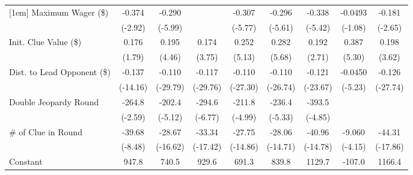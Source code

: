 \begin{table}[htbp]
\begin{tabular}{l*{8}{c}}
[1em]
Maximum Wager (\$)&      -0.374\sym{**} &      -0.290\sym{***}&                     &      -0.307\sym{***}&      -0.296\sym{***}&      -0.338\sym{***}&     -0.0493         &      -0.181\sym{**} \\
            &     (-2.92)         &     (-5.99)         &                     &     (-5.77)         &     (-5.61)         &     (-5.42)         &     (-1.08)         &     (-2.65)         \\
[1em]
Init. Clue Value (\$)&       0.176         &       0.195\sym{***}&       0.174\sym{***}&       0.252\sym{***}&       0.282\sym{***}&       0.192\sym{**} &       0.387\sym{***}&       0.198\sym{***}\\
            &      (1.79)         &      (4.46)         &      (3.75)         &      (5.13)         &      (5.68)         &      (2.71)         &      (5.30)         &      (3.62)         \\
[1em]
Dist. to Lead Opponent (\$)&      -0.137\sym{***}&      -0.110\sym{***}&      -0.117\sym{***}&      -0.110\sym{***}&      -0.110\sym{***}&      -0.121\sym{***}&     -0.0450\sym{***}&      -0.126\sym{***}\\
            &    (-14.16)         &    (-29.79)         &    (-29.76)         &    (-27.30)         &    (-26.74)         &    (-23.67)         &     (-5.23)         &    (-27.74)         \\
[1em]
Double Jeopardy Round&      -264.8\sym{**} &      -202.4\sym{***}&      -294.6\sym{***}&      -211.8\sym{***}&      -236.4\sym{***}&      -393.5\sym{***}&                     &                     \\
            &     (-2.59)         &     (-5.12)         &     (-6.77)         &     (-4.99)         &     (-5.33)         &     (-4.85)         &                     &                     \\
[1em]
\# of Clue in Round&      -39.68\sym{***}&      -28.67\sym{***}&      -33.34\sym{***}&      -27.75\sym{***}&      -28.06\sym{***}&      -40.96\sym{***}&      -9.060\sym{***}&      -44.31\sym{***}\\
            &     (-8.48)         &    (-16.62)         &    (-17.42)         &    (-14.86)         &    (-14.71)         &    (-14.78)         &     (-4.15)         &    (-17.86)         \\
[1em]
Constant    &       947.8\sym{***}&       740.5\sym{***}&       929.6\sym{***}&       691.3\sym{***}&       839.8\sym{***}&      1129.7\sym{***}&      -107.0         &      1166.4\sym{***}\\

\end{tabular}
\end{table}
